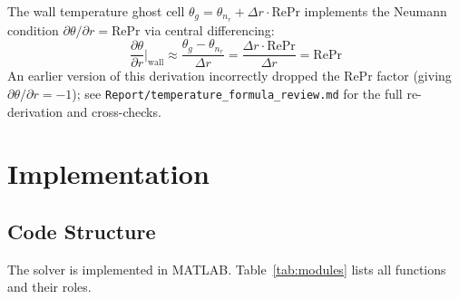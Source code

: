 \documentclass[12pt,a4paper]{article}
\newcommand{\parder}[2]{\frac{\partial #1}{\partial #2}}
\newcommand{\Rey}{\text{Re}}
\newcommand{\Pran}{\text{Pr}}
\begin{document}
The wall temperature ghost cell $\theta_g = \theta_{n_r} + \Delta r\cdot\Rey\Pran$ implements the Neumann condition $\partial\theta/\partial r = \Rey\Pran$ via central differencing:
\begin{equation}
    \parder{\theta}{r}\bigg|_{\text{wall}} \approx \frac{\theta_g - \theta_{n_r}}{\Delta r} = \frac{\Delta r\cdot\Rey\Pran}{\Delta r} = \Rey\Pran
\end{equation}
An earlier version of this derivation incorrectly dropped the $\Rey\Pran$ factor (giving $\partial\theta/\partial r = -1$); see \texttt{Report/temperature\_formula\_review.md} for the full re-derivation and cross-checks.

\newpage

\section{Implementation}

\subsection{Code Structure}

The solver is implemented in MATLAB.
Table~\ref{tab:modules} lists all functions and their roles.
\end{document}
